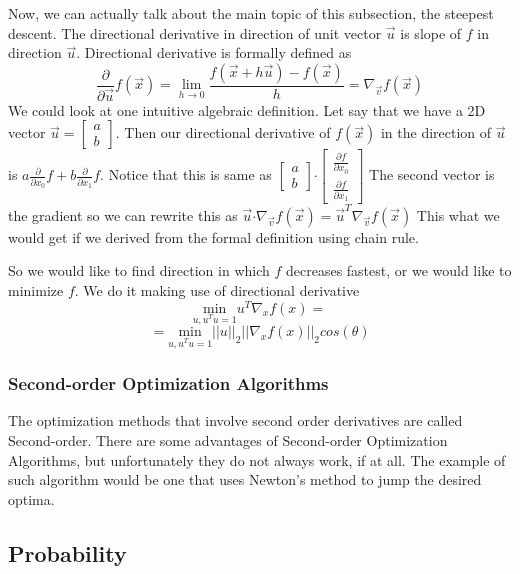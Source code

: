 \documentclass[paper=a4, fontsize=11pt]{scrartcl}
\numberwithin{equation}{section}		%
\numberwithin{figure}{section}			%
\numberwithin{table}{section}			%
\begin{document}
 Now, we can actually talk about the main topic of this subsection, the steepest descent. The directional derivative in direction of unit vector $\vec{u}$ is slope of $f$ in direction $\vec{u}$. Directional derivative is formally defined as $$ \frac{\partial}{\partial \vec{u}} f(\vec{x}) = \lim_{h\to0} \frac{f(\vec{x} + h\vec{u}) - f(\vec{x})}{h} = \nabla_{\vec{v}} f(\vec{x})$$
We could look at one intuitive algebraic definition. Let say that we have a 2D vector $\vec{u} = \begin{bmatrix} a \\ b \end{bmatrix}$. Then our directional derivative of $f(\vec{x})$ in the direction of $\vec{u}$ is $a\frac{\partial}{\partial x_0}f + b\frac{\partial}{\partial x_1}f$. Notice that this is same as $\begin{bmatrix} a \\ b \end{bmatrix} \boldsymbol{\cdot} \begin{bmatrix} \frac{\partial f}{\partial x_0} \\  \frac{\partial f}{\partial x_1} \end{bmatrix} $ The second vector is the gradient so we can rewrite this as $\vec{u} \boldsymbol{\cdot} \nabla_{\vec{v}} f(\vec{x}) = \vec{u}^T \nabla_{\vec{v}} f(\vec{x}) $ This what we would get if we derived from the formal definition using chain rule.  \par
So we would like to find direction in which $f$ decreases fastest, or we would like to minimize $f$. We do it making use of directional derivative 
$$\underset{u,u^Tu=1}{\text{min}} u^T\nabla_x f(x) =$$
$$ = \underset{u,u^Tu=1}{\text{min}} ||u||_2||\nabla_x f(x)||_2cos(\theta) $$


	\subsubsection{Second-order Optimization Algorithms}
	The optimization methods that involve second order derivatives are called Second-order. There are some advantages of Second-order Optimization Algorithms, but unfortunately they do not always work, if at all. The example of such algorithm would be one that uses Newton's method to jump the desired optima. 
	
	\subsection{Probability}
\end{document}
